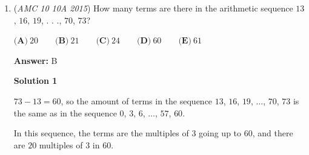 \begin{enumerate}
 $\textbf{(A)}\ \frac{5}{4}\qquad\textbf{(B)}\ \frac{3}{2}\qquad\textbf{(C)}\ \frac{9}{5}\qquad\textbf{(D)}\ 2 \qquad\textbf{(E)}\ \frac{5}{2}$

 \textbf{Answer: }B



\textbf{Solution 1}

Let $a$ be the bigger number and $b$ be the smaller.

 $a + b = 5(a - b)$.

 Multiplying out gives $a + b = 5a - 5b$ and rearranging gives $4a = 6b$ and factorised into $2a = 3b$ and then solving gives

 $\frac{a}{b} = \frac32$, so the answer is $\boxed{\textbf{(B) }\frac32}$.

 



\textbf{Solution 2}

Without loss of generality, let the two numbers be $3$ and $2$, as they clearly satisfy the condition of the problem. The ratio of the larger to the smaller is $\boxed{\textbf{(B) }\frac32}$.

 



\textbf{Solution 3}

Test every answer choice by letting $a$ and $b$ be the numbers in the numerator and denominator, respectively, with answer choice D being $\frac{2}{1},$ thus only $\boxed{\textbf{(B) }\frac32}$ works.

 


 


 


	\item (\textit{AMC 10 10A 2015}) How many terms are there in the arithmetic sequence $13$, $16$, $19$, . . ., $70$, $73$?


 $\textbf{(A)}\ 20\qquad\textbf{(B)}\ 21\qquad\textbf{(C)}\ 24\qquad\textbf{(D)}\ 60\qquad\textbf{(E)}\ 61$

 \textbf{Answer: }B



\textbf{Solution 1}

$73-13 = 60$, so the amount of terms in the sequence $13$, $16$, $19$, $\dotsc$, $70$, $73$ is the same as in the sequence $0$, $3$, $6$, $\dotsc$, $57$, $60$. 

 In this sequence, the terms are the multiples of $3$ going up to $60$, and there are $20$ multiples of $3$ in $60$. 


\end{enumerate}
